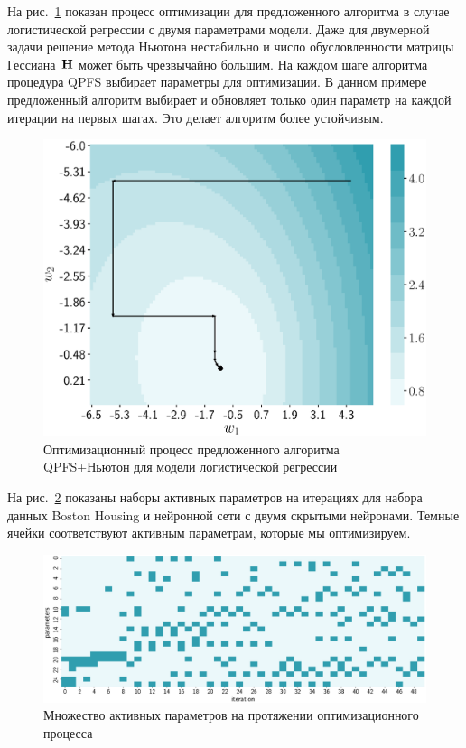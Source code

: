 На рис.~\ref{ch3:fig:irls_qpfs_2d} показан процесс оптимизации для предложенного алгоритма в случае логистической регрессии с двумя параметрами модели. 
Даже для двумерной задачи решение метода Ньютона нестабильно и число обусловленности матрицы Гессиана~$\mathbf{H}$ может быть чрезвычайно большим. 
На каждом шаге алгоритма процедура QPFS выбирает параметры для оптимизации. 
В данном примере предложенный алгоритм выбирает и обновляет только один параметр на каждой итерации на первых шагах. 
Это делает алгоритм более устойчивым.

\begin{figure}[!ht]
	\centering
	\includegraphics[width=0.6\linewidth]{figs/ch3/irls_qpfs_2d}	 
	\caption{Оптимизационный процесс предложенного алгоритма QPFS+Ньютон для модели логистической регрессии}
	\label{ch3:fig:irls_qpfs_2d}
\end{figure}

На рис.~\ref{ch3:fig:active_params_wrt_iters} показаны наборы активных параметров на итерациях для набора данных Boston Housing и нейронной сети с двумя скрытыми нейронами. 
Темные ячейки соответствуют активным параметрам, которые мы оптимизируем.
 
\begin{figure}[!ht]
	\centering
	\includegraphics[width=\linewidth]{figs/ch3/active_params_wrt_iters}	
	\caption{Множество активных параметров на протяжении оптимизационного процесса}
	\label{ch3:fig:active_params_wrt_iters}
\end{figure}

